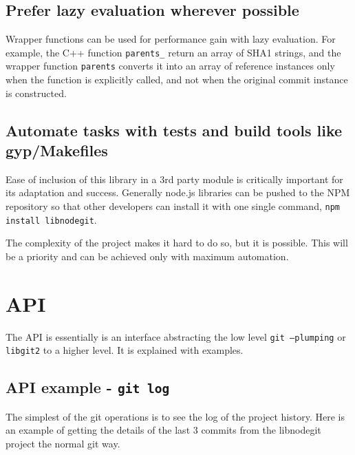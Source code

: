 \subsection{Prefer lazy evaluation wherever possible}

Wrapper functions can be used for performance gain with lazy evaluation. For
example, the C++ function \texttt{parents\_} return an array of SHA1 strings,
and the wrapper function \texttt{parents} converts it into an array of reference
instances only when the function is explicitly called, and not when the original
commit instance is constructed.

\subsection{Automate tasks with tests and build tools like gyp/Makefiles}

Ease of inclusion of this library in a 3rd party module is critically important
for its adaptation and success. Generally node.js libraries can be pushed to the
NPM\cite{npm} repository so that other developers can install it with one single
command, \texttt{npm install libnodegit}.

The complexity of the project makes it hard to do so, but it is possible. This
will be a priority and can be achieved only with maximum automation.

\section{API}

The API is essentially is an interface abstracting the low level \texttt{git
  --plumping} or \texttt{libgit2} to a higher level. It is explained with
examples.

\subsection{API example - \texttt{git log}}

The simplest of the git operations is to see the log of the project history.
Here is an example of getting the details of the last 3 commits from the
libnodegit project the normal git way.

